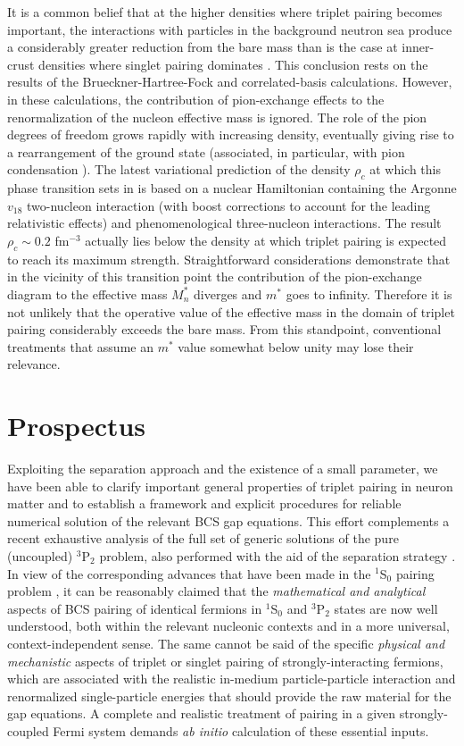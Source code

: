 It is a common belief that at the higher densities where
triplet pairing becomes important, the interactions with particles in 
the background neutron sea produce a considerably greater reduction 
from the bare mass than is the case at inner-crust densities where 
singlet pairing dominates \cite{ttr,chao}.  This conclusion rests on 
the results of the Brueckner-Hartree-Fock and correlated-basis 
calculations. However, in these calculations, the contribution of 
pion-exchange effects to the renormalization of the nucleon effective 
mass is ignored.  The role of the pion degrees of freedom grows rapidly 
with increasing density, eventually giving rise to a rearrangement 
of the ground state (associated, in particular, with pion condensation 
\cite{migdalpi,pireview}).  The latest variational prediction \cite{akmal} 
of the density $\rho_c$ at which this phase transition sets in is based 
on a nuclear Hamiltonian containing the Argonne $v_{18}$ two-nucleon 
interaction (with boost corrections to account for the leading relativistic 
effects) and phenomenological three-nucleon interactions.  The result 
$\rho_c\sim 0.2$ fm$^{-3}$ actually lies below the density at which 
triplet pairing is expected to reach its maximum strength.  Straightforward 
considerations \cite{dyugaev1,dyugaev2} demonstrate that in the vicinity 
of this transition point the contribution of the pion-exchange 
diagram to the effective mass $M_n^*$ diverges and $m^*$ goes to 
infinity.  Therefore it is not unlikely that the operative value 
of the effective mass in the domain of triplet pairing considerably 
exceeds the bare mass.  From this standpoint, conventional treatments
that assume an $m^*$ value somewhat below unity may lose their relevance.

\section{Prospectus \label{sec:concl}}
Exploiting the separation approach and the existence of a small
parameter, we have been able to clarify important general properties
of triplet pairing in neuron matter and to establish a framework and
explicit procedures for reliable numerical solution of the relevant 
BCS gap equations.  This effort complements a recent exhaustive analysis of 
the full set of generic solutions of the pure (uncoupled) $^3$P$_2$ problem, 
also performed with the aid of the separation strategy \cite{univ}.  In view 
of the corresponding advances that have been made in the $^1$S$_0$ pairing 
problem \cite{kkc,luso,jensen}, it can be reasonably claimed that the 
{\it mathematical and analytical} aspects of BCS pairing of identical 
fermions in $^1$S$_0$ and $^3$P$_2$ states are now well understood, both 
within the relevant nucleonic contexts and in a more universal, 
context-independent sense.  The same cannot be said of the specific 
{\it physical and mechanistic} aspects of triplet or singlet pairing 
of strongly-interacting fermions, which are associated with the realistic 
in-medium particle-particle interaction and renormalized single-particle 
energies that should provide the raw material for the gap equations.  
A complete and realistic treatment of pairing in a given strongly-coupled 
Fermi system demands {\it ab initio} calculation of these essential
inputs.  

